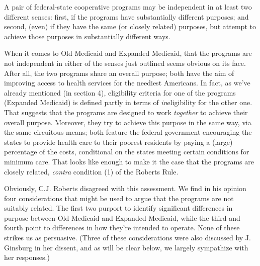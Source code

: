\documentclass[
  11pt,
  letterpaper,
  DIV=11,
  numbers=noendperiod,
  oneside]{scrartcl}
\begin{document}
A pair of federal-state cooperative programs may be independent in at
least two different senses: first, if the programs have substantially
different purposes; and second, (even) if they have the same (or closely
related) purposes, but attempt to achieve those purposes in
substantially different ways.

When it comes to Old Medicaid and Expanded Medicaid, that the programs
are not independent in either of the senses just outlined seems obvious
on its face. After all, the two programs share an overall purpose; both
have the aim of improving access to health services for the neediest
Americans. In fact, as we've already mentioned (in section 4),
eligibility criteria for one of the programs (Expanded Medicaid) is
defined partly in terms of \emph{in}eligibility for the other one. That
suggests that the programs are designed to work \emph{together} to
achieve their overall purpose. Moreover, they try to achieve this
purpose in the same way, via the same circuitous means; both feature the
federal government encouraging the states to provide health care to
their poorest residents by paying a (large) percentage of the costs,
conditional on the states meeting certain conditions for minimum care.
That looks like enough to make it the case that the programs are closely
related, \emph{contra} condition (1) of the Roberts Rule.

Obviously, C.J. Roberts disagreed with this assessment. We find in his
opinion four considerations that might be used to argue that the
programs are not suitably related. The first two purport to identify significant
differences in purpose between Old Medicaid and Expanded Medicaid, while
the third and fourth point to differences in how they're intended to
operate. None of these strikes us as persuasive. (Three of these
considerations were also discussed by J. Ginsburg in her dissent, and as
will be clear below, we largely sympathize with her
responses.)
\end{document}
